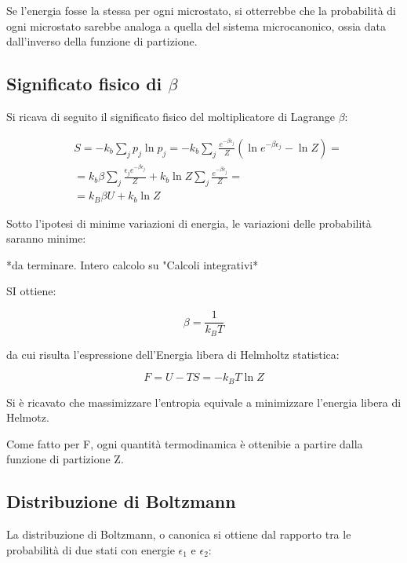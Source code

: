 \documentclass{article}
\begin{document}
Se l'energia fosse la stessa per ogni microstato, si otterrebbe che la probabilità di ogni microstato sarebbe analoga a quella del sistema microcanonico, ossia data dall'inverso della funzione di partizione.

\subsection{Significato fisico di $\beta$}
Si ricava di seguito il significato fisico del moltiplicatore di Lagrange $\beta$:

\begin{equation}
    \begin{aligned}
         & S=-k_b\sum_{j}p_j\ln{p_j}=-k_b\sum_{j}\frac{e^{-\beta \epsilon_j}}{Z}(\ln{e^{-\beta \epsilon_j}}-\ln{Z})=     \\
         & =k_b\beta\sum_{j}\frac{\epsilon_j e^{-\beta \epsilon_j}}{Z}+k_b\ln{Z}\sum_{j}\frac{e^{-\beta \epsilon_j}}{Z}= \\
         & =k_B\beta U+k_b\ln{Z}
    \end{aligned}
\end{equation}

Sotto l'ipotesi di minime variazioni di energia, le variazioni delle probabilità saranno minime:

*da terminare. Intero calcolo su "Calcoli integrativi*

SI ottiene:

\begin{equation}
    \beta=\frac{1}{k_BT}
\end{equation}

da cui risulta l'espressione dell'Energia libera di Helmholtz statistica:

\begin{equation}
    F=U-TS=-k_BT\ln{Z}
\end{equation}

Si è ricavato che massimizzare l'entropia equivale a minimizzare l'energia libera di Helmotz.

Come fatto per F, ogni quantità termodinamica è ottenibie a partire dalla funzione di partizione Z.

\subsection{Distribuzione di Boltzmann}
La distribuzione di Boltzmann, o canonica si ottiene dal rapporto tra le probabilità di due stati con energie $\epsilon_1$ e $\epsilon_2$:
\end{document}
